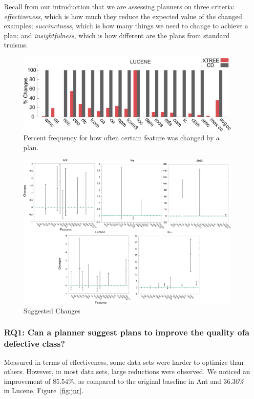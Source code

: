 \documentclass{sig-alternate}
\newcommand{\fig}[1]{Figure~\ref{fig:#1}}
\begin{document}
 
Recall from our introduction that we are assessing planners on three criteria:
{\em effectiveness}, which is how much they reduce the expected value of the changed examples;
{\em succinctness}, which is how many things we need to change to achieve a plan;
and {\em insightfulness}, which is how different are the plans from standard truisms.

\begin{figure}[tbp!]
\centering
\includegraphics[width=\linewidth]{figs/PercentChanges.png}
\caption{Percent frequency for how often certain feature was changed by a plan.}\label{fig:changed}
\end{figure}


\begin{figure}[tbp!]
\centering
\includegraphics[width=0.8\linewidth]{figs/changes0.png}
\caption{Suggested Changes}
\label{figs:changes}
\end{figure}

\subsubsection{RQ1: Can a planner suggest plans to improve the quality ofa defective class?}

Measured in terms of effectiveness, some data sets were harder to optimize than others. However, in most data sets, large reductions were observed. We noticed an improvement of 85.54\%, as compared to the original baseline in Ant and 36.36\% in Lucene, \fig{jur}.
\end{document}
